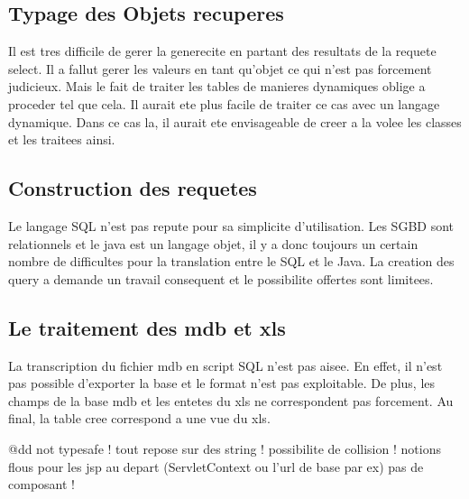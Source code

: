 \subsection{Typage des Objets recuperes}
Il est tres difficile de gerer la generecite en partant des resultats de la requete select. Il a fallut gerer les valeurs en tant qu'objet ce qui n'est pas forcement judicieux. Mais le fait de traiter les tables de manieres dynamiques oblige a proceder tel que cela. Il aurait ete plus facile de traiter ce cas avec un langage dynamique. Dans ce cas la, il aurait ete envisageable de creer a la volee les classes et les traitees ainsi.
\subsection{Construction des requetes}
Le langage SQL n'est pas repute pour sa simplicite d'utilisation. Les SGBD sont relationnels et le java est un langage objet, il y a donc toujours un certain nombre de difficultes pour la translation entre le SQL et le Java. La creation des query a demande un travail consequent et le possibilite offertes sont limitees.
\subsection{Le traitement des mdb et xls}
La transcription du fichier mdb en script SQL n'est pas aisee. En effet, il n'est pas possible d'exporter la base et le format n'est pas exploitable. De plus, les champs de la base mdb et les entetes du xls ne correspondent pas forcement. Au final, la table cree correspond a une vue du xls.






@dd
not typesafe !
tout repose sur des string !
possibilite de collision !
notions flous pour les jsp  au depart (ServletContext ou l'url de base par ex)
pas de composant !